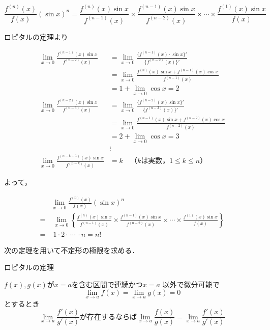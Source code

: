 \begin{解答}
\begin{解答}
\begin{fleqn}[2zw]
\[
\frac{f^{(n)}(x)}{f(x)}(\sin x)^{n}=\frac{f^{(n)}(x)\sin x}{f^{( n-1 )}( x )}\times\frac{f^{( n-1 )}( x )\sin x}{f^{( n-2 )}( x )}\times \cdots \times \frac{f^{(1)}(x)\sin x}{f( x )}
\]
\end{fleqn}
\end{解答}
ロピタルの定理より
\begin{fleqn}[4zw]
\begin{align*}
\lim_{x\to0}\frac{f^{(n-1)}(x)\sin x}{f^{(n-2)}(x)}&=\lim_{x\to0} \frac{\{f^{(n-1)}(x)\cdot \sin x \}'}{\{f^{(n-2)}(x) \}'}\\
	& =\lim_{x\to0} \frac{f^{(n)}(x)\sin x +f^{(n-1)}(x)\cos x}{f^{(n-1)}(x)}\\
	&=1+\lim_{x\to0}\cos x=2\\
\lim_{x\to0}\frac{f^{(n-2)}(x)\sin x}{f^{(n-3)}(x)}
	&=\lim_{x\to0}\frac{\{f^{(n-2)}(x)\sin x \}'}{\{ f^{(n-3)}(x)\}'}\\
	&=\lim_{x\to0}\frac{f^{(n-1)}(x)\sin x+f^{(n-2)}(x)\cos x}{f^{(n-2)}(x)}\\
	&=2+\lim_{x\to0}\cos x=3\\
	&\vdots\\
\lim_{x\to0}\frac{f^{(n-k+1)}(x)\sin x}{f^{(n-k)}(x)}
	&=k\quad\text{（$k$は実数，$1\leq  k\leq  n$）}
\end{align*}
\end{fleqn}
よって，
\begin{fleqn}[4zw]
\begin{align*}
&\lim_{x\to0}\frac{f^{(n)}(x)}{f(x)}(\sin x)^{n}\\
=&\;\lim_{x\to0}
	\left\{\frac{f^{(n)}(x)\sin x}{f^{(n-1)}(x)}\!\times\!
		\frac{f^{(n-1)}(x)\sin x}{f^{(n-2)}(x)}
		\!\times\!\cdots\!\times\!
			\frac{f^{(1)}(x)\sin x}{f(x)}\right\}\\
			=&\;1\cdot 2\cdot\, \cdots\, \cdot n=n!\tag*{\Kotae}
\end{align*}
\end{fleqn}
\end{解答}
\begin{解説}
 次の定理を用いて不定形の極限を求める．

\begin{titlebox}{ロピタルの定理}
\begin{fleqn}[4zw]
$f(x),g(x)$が$x=a$を含む区間で連続かつ$x=a$ 以外で微分可能で
\[
\lim_{x\to a}f(x)=\lim_{x\to a}g(x)=0
\]
とするとき
\[
\lim_{x\to a}\frac{f'(x)}{g'(x)}\text{が存在するならば}
\lim_{x\to a}\frac{f(x)}{g(x)}=\lim_{x\to a}\frac{f'(x)}{g'(x)}
\]
\end{fleqn}
\end{titlebox}
\end{解説}


